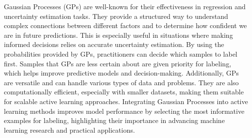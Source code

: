\documentclass[11pt]{article}
\begin{document}
Gaussian Processes (GPs) are well-known for their effectiveness in regression and uncertainty estimation tasks. They provide a structured way to understand complex connections between different factors and to determine how confident we are in future predictions. This is especially useful in situations where making informed decisions relies on accurate uncertainty estimation. By using the probabilities provided by GPs, practitioners can decide which samples to label first. Samples that GPs are less certain about are given priority for labeling, which helps improve predictive models and decision-making. Additionally, GPs are versatile and can handle various types of data and problems. They are also computationally efficient, especially with smaller datasets, making them suitable for scalable active learning approaches\cite{kapoor_active_2007}. Integrating Gaussian Processes into active learning methods improves model performance by selecting the most informative examples for labeling, highlighting their importance in advancing machine learning research and practical applications.
\end{document}
